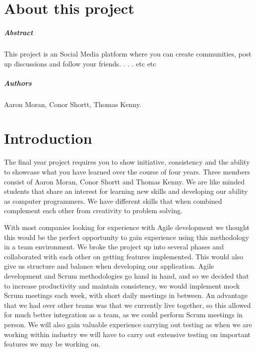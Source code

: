 
\chapter*{About this project}
\paragraph{Abstract}
This project is an Social Media platform where you can create communities, post up discussions and follow your friends. . . .  etc etc

\paragraph{Authors}
Aaron Moran, Conor Shortt, Thomas Kenny.

\chapter{Introduction}
The final year project requires you to show initiative, consistency and the ability to showcase what you have learned over the course of four years.
Three members consist of Aaron Moran, Conor Shortt and Thomas Kenny. We are like minded students that share an interest for learning new skills and developing our ability as computer programmers. We have different skills that when combined complement each other from creativity to problem solving. 
\newline

With most companies looking for experience with Agile development we thought this would be the perfect opportunity to gain experience using this methodology in a team environment. We broke the project up into several phases and collaborated with each other on getting features implemented. This would also give us structure and balance when developing our application. Agile development and Scrum methodologies go hand in hand, and so we decided that to increase productivity and maintain consistency, we would implement mock Scrum meetings each week, with short daily meetings in between. An advantage that we had over other teams was that we currently live together, so this allowed for much better integration as a team, as we could perform Scrum meetings in person. We will also gain valuable experience carrying out testing as when we are working within industry we will have to carry out extensive testing on important features we may be working on.
\newline

